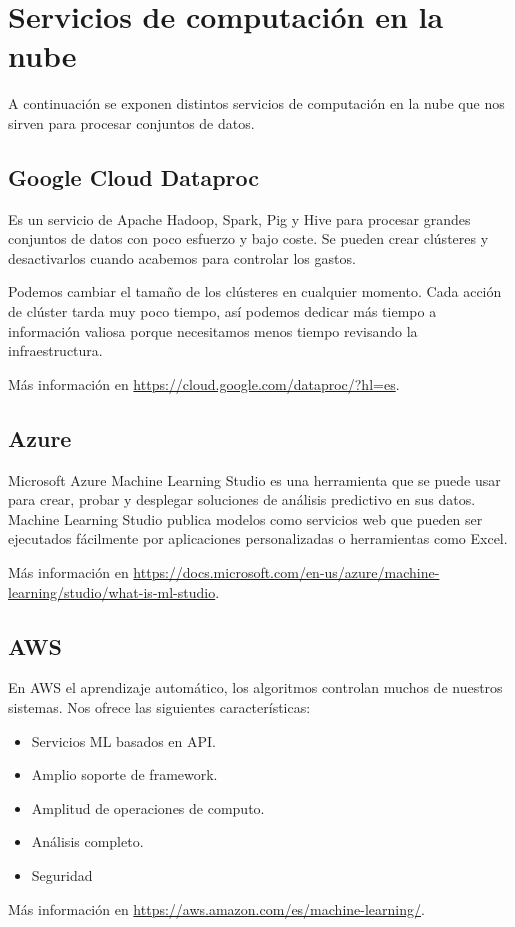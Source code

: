 \section{Servicios de computación en la nube}
A continuación se exponen distintos servicios de computación en la nube que nos sirven para procesar conjuntos de datos.

\subsection{Google Cloud Dataproc}
Es un servicio de Apache Hadoop, Spark, Pig y Hive para procesar grandes conjuntos de datos con poco esfuerzo y bajo coste. Se pueden crear clústeres y desactivarlos cuando acabemos para  controlar los gastos.

Podemos cambiar el tamaño de los clústeres en cualquier momento. Cada acción de clúster tarda muy poco tiempo, así podemos dedicar más tiempo a información valiosa porque necesitamos menos tiempo revisando la infraestructura.

Más información en \url{https://cloud.google.com/dataproc/?hl=es}.

\subsection{Azure}
Microsoft Azure Machine Learning Studio es una herramienta que se puede usar para crear, probar y desplegar soluciones de análisis predictivo en sus datos. Machine Learning Studio publica modelos como servicios web que pueden ser ejecutados fácilmente por aplicaciones personalizadas o herramientas como Excel.

Más información en \url{https://docs.microsoft.com/en-us/azure/machine-learning/studio/what-is-ml-studio}.

\subsection{AWS}
En AWS el aprendizaje automático, los algoritmos controlan muchos de nuestros sistemas. Nos ofrece las siguientes características:
\begin{itemize}
	\item Servicios ML basados en API.
	\item Amplio soporte de framework.
	\item Amplitud de operaciones de computo.
	\item Análisis completo.
	\item Seguridad
\end{itemize}

Más información en \url{https://aws.amazon.com/es/machine-learning/}.	